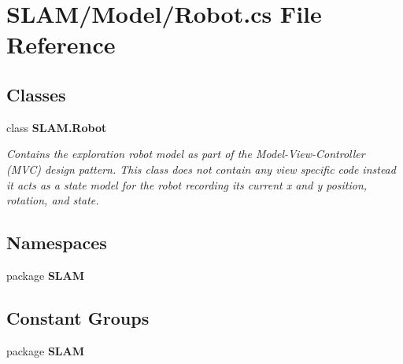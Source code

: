 \section{S\-L\-A\-M/\-Model/\-Robot.cs File Reference}
\label{_robot_8cs}
\subsection*{Classes}
\begin{DoxyCompactItemize}
\item 
class {\bf S\-L\-A\-M.\-Robot}
\begin{DoxyCompactList}\small\item\em Contains the exploration robot model as part of the Model-\/\-View-\/\-Controller (M\-V\-C) design pattern. This class does not contain any view specific code instead it acts as a state model for the robot recording its current x and y position, rotation, and state. \end{DoxyCompactList}\end{DoxyCompactItemize}
\subsection*{Namespaces}
\begin{DoxyCompactItemize}
\item 
package {\bf S\-L\-A\-M}
\end{DoxyCompactItemize}
\subsection*{Constant Groups}
\begin{DoxyCompactItemize}
\item 
package {\bf S\-L\-A\-M}
\end{DoxyCompactItemize}
